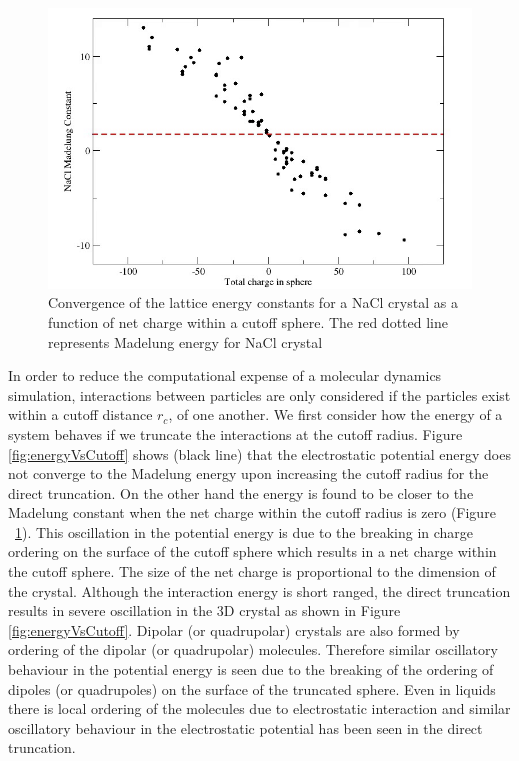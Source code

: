 \begin{figure}[tpb]
  \begin{center}
    \centerline{\includegraphics[scale=0.8]{energyVsNetcharge.png}}
    \caption{Convergence of the lattice energy constants for a NaCl crystal as a function of net charge within a cutoff sphere. The red dotted line represents Madelung energy for NaCl crystal}
    \label{fig:energyVsCharge}
  \end{center}
\end{figure}

In order to reduce the computational expense of a molecular dynamics simulation, interactions between particles are only considered if the particles exist within a cutoff distance $r_c$, of one another. We first consider how the energy of a system behaves if we truncate the interactions at the cutoff radius.  Figure \ref{fig:energyVsCutoff} shows (black line) that the electrostatic potential energy does not converge to the Madelung energy upon increasing the cutoff radius for the direct truncation. On the other hand the energy is found to be closer to the Madelung constant when the net charge within the cutoff radius is zero (Figure ~\ref{fig:energyVsCharge}). This oscillation in the potential energy is due to the breaking in charge ordering on the surface of the cutoff sphere which results in a net charge within the cutoff sphere. The size of the net charge is proportional to the dimension of the crystal. Although the interaction energy is short ranged,  the direct truncation results in severe oscillation in the 3D crystal as shown in Figure \ref{fig:energyVsCutoff}. Dipolar (or quadrupolar) crystals are also formed by ordering of the dipolar (or quadrupolar) molecules. Therefore similar oscillatory behaviour in the potential energy is seen due to the breaking of the ordering of dipoles (or quadrupoles) on the surface of the truncated sphere. Even in liquids there is local ordering of the molecules due to electrostatic interaction and similar oscillatory behaviour in the electrostatic potential has been seen in the direct truncation.

